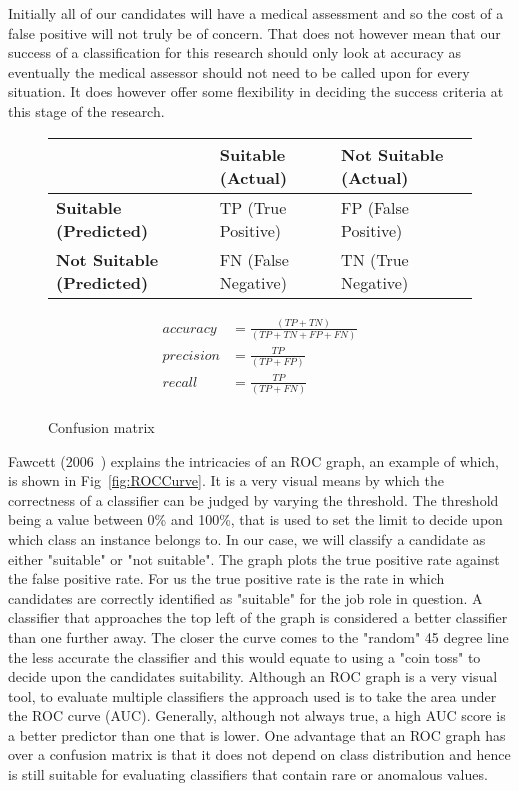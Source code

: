 Initially all of our candidates will have a medical assessment and so the cost of a false positive will not truly be of concern. That does not however mean that our success of a classification for this research should only look at accuracy as eventually the medical assessor should not need to be called upon for every situation. It does however offer some flexibility in deciding the success criteria at this stage of the research.

\begin{figure}[h]
    \caption{Confusion matrix} \label{fig:ConfusionMatrix}
    \begin{tabular}{|l|l|l|}
        \hline
                                          & \textbf{Suitable (Actual)} & \textbf{Not Suitable (Actual)} \\ \hline
        \textbf{Suitable (Predicted)}     & TP (True Positive)         & FP (False Positive)            \\ \hline
        \textbf{Not Suitable (Predicted)} & FN (False Negative)        & TN (True Negative)             \\ \hline
    \end{tabular}

    \begin{align*}
        accuracy  & = \frac{(TP+TN)}{(TP+TN+FP+FN)} \\
        precision & = \frac{TP}{(TP+FP)}            \\
        recall    & = \frac{TP}{(TP+FN)}            \\
    \end{align*}

\end{figure}


\noindent
Fawcett (2006~\cite{fawcett2006introduction}) explains the intricacies of an ROC graph, an example of which, is shown in Fig~\ref{fig:ROCCurve}. It is a very visual means by which the correctness of a classifier can be judged by varying the threshold. The threshold being a value between 0\% and 100\%, that is used to set the limit to decide upon which class an instance belongs to. In our case, we will classify a candidate as either "suitable" or "not suitable". The graph plots the true positive rate against the false positive rate. For us the true positive rate is the rate in which candidates are correctly identified as "suitable" for the job role in question. A classifier that approaches the top left of the graph is considered a better classifier than one further away. The closer the curve comes to the "random" 45 degree line the less accurate the classifier and this would equate to using a "coin toss" to decide upon the candidates suitability. Although an ROC graph is a very visual tool, to evaluate multiple classifiers the approach used is to take the area under the ROC curve (AUC). Generally, although not always true, a high AUC score is a better predictor than one that is lower. One advantage that an ROC graph has over a confusion matrix is that it does not depend on class distribution and hence is still suitable for evaluating classifiers that contain rare or anomalous values.

